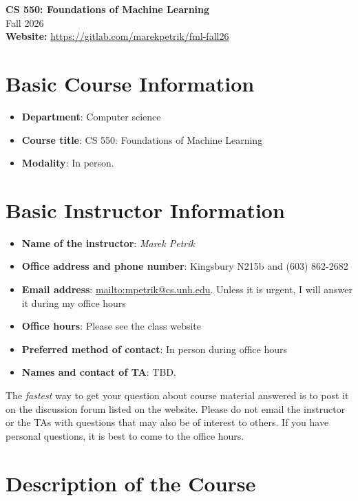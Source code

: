 \documentclass[11pt]{article}
\date{}
\begin{document}
\begin{center}
	{\Large\bf CS 550: Foundations of Machine Learning}\\
	Fall 2026\\
	\textbf{Website:} \url{https://gitlab.com/marekpetrik/fml-fall26}
\end{center}


\section{Basic Course Information}

\begin{itemize}
\item \textbf{Department}: Computer science
\item \textbf{Course title}: CS 550: Foundations of Machine Learning
\item \textbf{Modality}: In person.
\end{itemize}

\section{Basic Instructor Information}

\begin{itemize}
\item \textbf{Name of the instructor}: \emph{Marek Petrik}
\item \textbf{Office address and phone number}: Kingsbury N215b and  (603) 862-2682
\item \textbf{Email address}: \url{mailto:mpetrik@cs.unh.edu}. Unless it is urgent, I will answer it during my office hours
\item \textbf{Office hours}: Please see the class website
\item \textbf{Preferred method of contact}: In person during office hours
\item \textbf{Names and contact of TA}: TBD. 
\end{itemize}

The \emph{fastest} way to get your question about course material answered is to post it on the discussion forum listed on the website. Please do not email the instructor or the TAs with questions that may also be of interest to others. If you have personal questions, it is best to come to the office hours.

\section{Description of the Course}
\end{document}
